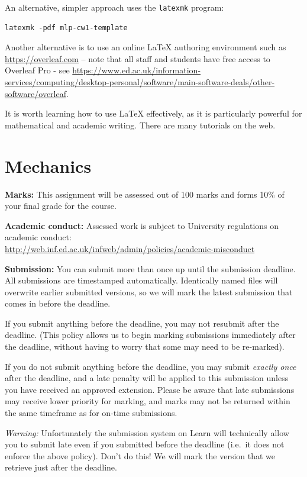 \documentclass[11pt,]{article}
\begin{document}
An alternative, simpler approach uses the \verb+latexmk+ program:
\begin{verbatim}
latexmk -pdf mlp-cw1-template
\end{verbatim}

Another alternative is to use an online LaTeX authoring environment such as \url{https://overleaf.com} -- note that all staff and students have free access to Overleaf Pro - see \url{https://www.ed.ac.uk/information-services/computing/desktop-personal/software/main-software-deals/other-software/overleaf}.

It is worth learning how to use LaTeX effectively, as it is particularly powerful for mathematical and academic writing.  There are many tutorials on the web.


\section{Mechanics}
\label{sec:mechanics}

\textbf{Marks:} 
This assignment will be assessed out of 100 marks and forms 10\% of your final grade for the course.

\textbf{Academic conduct:} 
Assessed work is subject to University
regulations on academic
conduct:\\ {\small \url{http://web.inf.ed.ac.uk/infweb/admin/policies/academic-misconduct}}

\textbf{Submission:} 
You can submit more than once up until the submission deadline. All
submissions are timestamped automatically. Identically named files
will overwrite earlier submitted versions, so we will mark the latest
submission that comes in before the deadline.

If you submit anything before the deadline, you may not resubmit
after the deadline. (This policy allows us to begin marking submissions
immediately after the deadline, without having to worry that some may
need to be re-marked).

If you do not submit anything before the deadline, you may submit {\em
exactly once} after the deadline, and a late penalty will be applied
to this submission unless you have received an approved extension.
Please be aware that late submissions may receive lower priority for
marking, and marks may not be returned within the same timeframe as
for on-time submissions.

{\em Warning:} Unfortunately the submission system on Learn will technically
allow you to submit late even if you submitted before the deadline
(i.e.\ it does not enforce the above policy). Don't do this! We will
mark the version that we retrieve just after the deadline.
\end{document}
